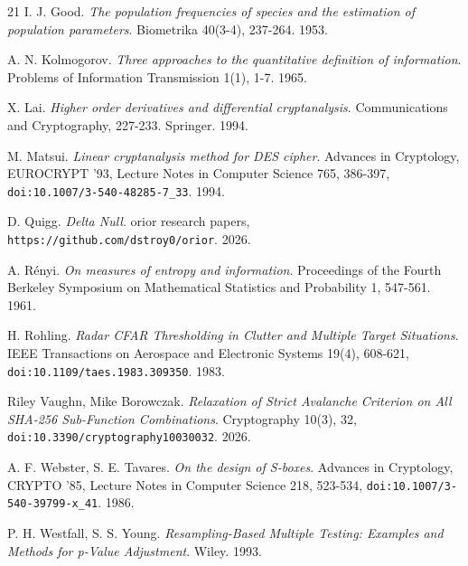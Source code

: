 \begin{thebibliography}{21}
I. J. Good. \emph{The population frequencies of species and the estimation of population parameters}. Biometrika 40(3-4), 237-264. 1953.

A. N. Kolmogorov. \emph{Three approaches to the quantitative definition of information}. Problems of Information Transmission 1(1), 1-7. 1965.

X. Lai. \emph{Higher order derivatives and differential cryptanalysis}. Communications and Cryptography, 227-233. Springer. 1994.

M. Matsui. \emph{Linear cryptanalysis method for DES cipher}. Advances in Cryptology, EUROCRYPT '93, Lecture Notes in Computer Science 765, 386-397, \texttt{doi:10.1007/\allowbreak{}3-540-48285-7\_\allowbreak{}33}. 1994.

D. Quigg. \emph{Delta Null}. orior research papers, \texttt{https:/\allowbreak{}/\allowbreak{}github.com/\allowbreak{}dstroy0/\allowbreak{}orior}. 2026.

A. Rényi. \emph{On measures of entropy and information}. Proceedings of the Fourth Berkeley Symposium on Mathematical Statistics and Probability 1, 547-561. 1961.

H. Rohling. \emph{Radar CFAR Thresholding in Clutter and Multiple Target Situations}. IEEE Transactions on Aerospace and Electronic Systems 19(4), 608-621, \texttt{doi:10.1109/\allowbreak{}taes.1983.309350}. 1983.

Riley Vaughn, Mike Borowczak. \emph{Relaxation of Strict Avalanche Criterion on All SHA-256 Sub-Function Combinations}. Cryptography 10(3), 32, \texttt{doi:10.3390/\allowbreak{}cryptography10030032}. 2026.

A. F. Webster, S. E. Tavares. \emph{On the design of S-boxes}. Advances in Cryptology, CRYPTO '85, Lecture Notes in Computer Science 218, 523-534, \texttt{doi:10.1007/\allowbreak{}3-540-39799-x\_\allowbreak{}41}. 1986.

P. H. Westfall, S. S. Young. \emph{Resampling-Based Multiple Testing: Examples and Methods for p-Value Adjustment}. Wiley. 1993.

\end{thebibliography}
